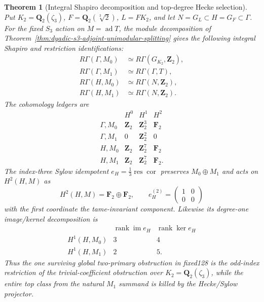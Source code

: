 \documentclass[11pt]{article}
\newtheorem{theorem}{Theorem}[section]
\theoremstyle{definition}
\begin{document}
\begin{theorem}[Integral Shapiro decomposition and top-degree Hecke selection]
\label{thm:dyadic-s3-adjoint-shapiro-hecke}
Put $K_2=\mathbf Q_2(\zeta_3)$,
$F=\mathbf Q_2(\sqrt[3]2)$,
$L=FK_2$, and let
$N=G_L\subset H=G_F\subset\Gamma$.
For the fixed $S_3$ action on
$M=\operatorname{ad}T$,
the module decomposition of
Theorem~\ref{thm:dyadic-s3-adjoint-unimodular-splitting}
gives the following
\emph{integral} Shapiro and
restriction identifications:
\begin{equation}\label{eq:dyadic-s3-adjoint-shapiro-global-h}
\boxed{
\begin{aligned}
R\Gamma(\Gamma,M_0)&\simeq
R\Gamma(G_{K_2},\mathbf Z_2),\\
R\Gamma(\Gamma,M_1)&\simeq
R\Gamma(\Gamma,T),\\
R\Gamma(H,M_0)&\simeq
R\Gamma(N,\mathbf Z_2),\\
R\Gamma(H,M_1)&\simeq
R\Gamma(N,\mathbf Z_2).
\end{aligned}}
\end{equation}
The cohomology ledgers are
\begin{equation}\label{eq:dyadic-s3-adjoint-shapiro-ledgers}
\begin{array}{c|ccc}
& H^0&H^1&H^2\\ \hline
\Gamma,M_0&\mathbf Z_2&\mathbf Z_2^3&\mathbf F_2\\
\Gamma,M_1&0&\mathbf Z_2^2&0\\
H,M_0&\mathbf Z_2&\mathbf Z_2^7&\mathbf F_2\\
H,M_1&\mathbf Z_2&\mathbf Z_2^7&\mathbf F_2 .
\end{array}
\end{equation}
The index-three Sylow idempotent
$e_H=\tfrac13\operatorname{res}\operatorname{cor}$
preserves $M_0\oplus M_1$ and
acts on $H^2(H,M)$ as
\begin{equation}\label{eq:dyadic-s3-adjoint-top-hecke-projection}
\boxed{\quad
H^2(H,M)=\mathbf F_2\oplus\mathbf F_2,
\qquad
e_H^{(2)}=
\begin{pmatrix}1&0\\0&0\end{pmatrix}
\quad}
\end{equation}
with the first coordinate
the tame-invariant component.
Likewise its degree-one
image/kernel decomposition is
\[
\begin{array}{c|cc}
&\operatorname{rank}\operatorname{im}e_H&
\operatorname{rank}\ker e_H\\ \hline
H^1(H,M_0)&3&4\\
H^1(H,M_1)&2&5.
\end{array}
\]
Thus the one surviving global
two-primary obstruction in
fixed128 is the
\emph{odd-index restriction}
of the trivial-coefficient
obstruction over
$K_2=\mathbf Q_2(\zeta_3)$,
while the entire top class
from the natural $M_1$
summand is killed by
the Hecke/Sylow projector.
\end{theorem}
\end{document}
